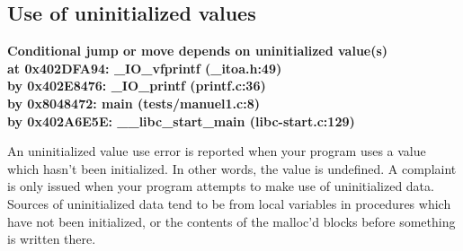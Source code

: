 \documentclass{article}
\begin{document}
\subsection{Use of uninitialized values}
\begin{flushleft}
\textbf{Conditional jump or move depends on uninitialized value(s)\\
\hspace{15pt} at 0x402DFA94: \_IO\_vfprintf (\_itoa.h:49)\\
\hspace{15pt} by 0x402E8476: \_IO\_printf (printf.c:36)\\
\hspace{15pt} by 0x8048472: main (tests/manuel1.c:8)\\
\hspace{15pt} by 0x402A6E5E: \_\_libc\_start\_main (libc-start.c:129)}
\end{flushleft}
An uninitialized value use error is reported when your program uses a value which hasn't been initialized.
In other words, the value is undefined.
A complaint is only issued when your program attempts to make use of uninitialized data.
Sources of uninitialized data tend to be from local variables in procedures which have not been initialized, or the contents of the malloc'd blocks before something is written there.
\end{document}
